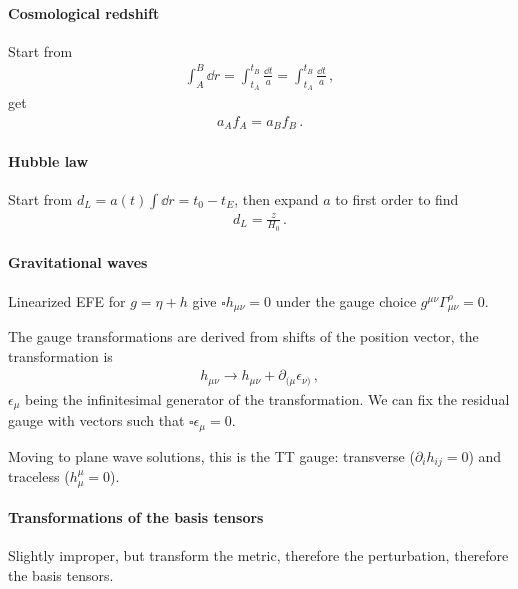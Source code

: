 \documentclass[main.tex]{subfiles}
\begin{document}
\paragraph{Cosmological redshift}

Start from 
%
\begin{align}
\int_A^{B} \dd{r} = \int_{t_A}^{t_B} \frac{ \dd{t}}{a}
= \int_{t_A}^{t_B} \frac{ \dd{t}}{a}
\,,
\end{align}
get 
%
\begin{align}
a_A f_A = a_B f_B
\,.
\end{align}
%


\paragraph{Hubble law}

Start from \(d_{L} = a(t) \int \dd{r} = t_0 - t_E\), then expand \(a\) to first order to find 
%
\begin{align}
d_L = \frac{z}{H_0 }
\,.
\end{align}

\paragraph{Gravitational waves}

Linearized EFE for \(g = \eta + h\) give \(\square h_{\mu 
\nu } = 0\) under the gauge choice \(g^{\mu \nu } \Gamma^
{\rho }_{\mu \nu } =0\).

The gauge transformations are derived from shifts of the position vector, the transformation is 
%
\begin{align}
h_{\mu \nu } \rightarrow h_{\mu \nu } + \partial_{(\mu } \epsilon_{\nu )}
\,,
\end{align}
%
\(\epsilon_{\mu } \) being the infinitesimal generator of the transformation. We can fix the residual gauge with vectors such that \(\square \epsilon_{\mu } =0\). 

Moving to plane wave solutions, this is the TT gauge: transverse (\(\partial_{i} h_{ij} = 0\)) and traceless (\(h^{\mu }_{\mu } = 0\)). 

\paragraph{Transformations of the basis tensors}

Slightly improper, but transform the metric, therefore the perturbation, therefore the basis tensors. 
\end{document}
